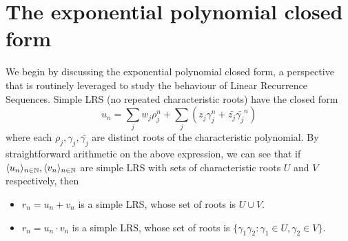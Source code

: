 \section{The exponential polynomial closed form}
\label{section:solspace}
We begin by discussing the exponential polynomial closed form, a perspective that is routinely leveraged to study the behaviour of Linear Recurrence Sequences. Simple LRS (no repeated characteristic roots) have the closed form
\begin{equation}
\label{eq:exppoly}
u_n = \sum_j w_j \rho_j^n + \sum_j (z_j \gamma_j^n + \bar{z_j}\bar{\gamma_j}^n)
\end{equation}
where each $\rho_j, \gamma_j, \bar{\gamma_j}$ are distinct roots of the characteristic polynomial. By straightforward arithmetic on the above expression, we can see that if $\langle u_n\rangle_{n\in \mathbb{N}}, \langle v_n\rangle_{n\in \mathbb{N}}$ are simple LRS with sets of characteristic roots $U$ and $V$ respectively, then
\begin{itemize}
\item $r_n = u_n + v_n$ is a simple LRS, whose set of roots is $U \cup V$.
\item $r_n = u_n \cdot v_n$ is a simple LRS, whose set of roots is $\{\gamma_1\gamma_2: \gamma_1 \in U, \gamma_2 \in V\}$.
\end{itemize}

